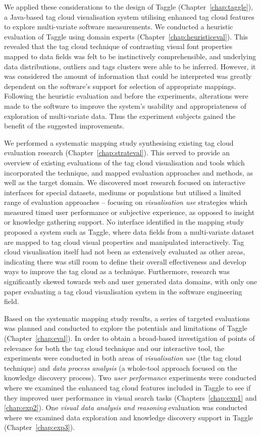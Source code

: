 We applied these considerations to the design of Taggle (Chapter~\ref{chap:taggle}), a Java-based tag cloud visualisation system utilising enhanced tag cloud features to explore multi-variate software measurements. We conducted a heuristic evaluation of Taggle using domain experts (Chapter~\ref{chap:heuristiceval}). This revealed that the tag cloud technique of contrasting visual font properties mapped to data fields was felt to be instinctively comprehensible, and underlying data distributions, outliers and tags clusters were able to be inferred. However, it was considered the amount of information that could be interpreted was greatly dependent on the software's support for selection of appropriate mappings. Following the heuristic evaluation and before the experiments, alterations were made to the software to improve the system's usability and appropriateness of exploration of multi-variate data. Thus the experiment subjects gained the benefit of the suggested improvements.

We performed a systematic mapping study synthesising existing tag cloud evaluation research (Chapter~\ref{chap:strateval}). This served to provide an overview of existing evaluations of the tag cloud visualisation and tools which incorporated the technique, and mapped evaluation approaches and methods, as well as the target domain. We discovered most research focused on interactive interfaces for special datasets, mediums or populations but utilised a limited range of evaluation approaches -- focusing on \emph{visualisation use} strategies which measured timed user performance or subjective experience, as opposed to insight or knowledge gathering support. No interface identified in the mapping study proposed a system such as Taggle, where data fields from a multi-variate dataset are mapped to tag cloud visual properties and manipulated interactively. Tag cloud visualisation itself had not been as extensively evaluated as other areas, indicating there was still room to define their overall effectiveness and develop ways to improve the tag cloud as a technique. Furthermore, research was significantly skewed towards web and user generated data domains, with only one paper evaluating a tag cloud visualisation system in the software engineering field. 

Based on the systematic mapping study results, a series of targeted evaluations was planned and conducted to explore the potentials and limitations of Taggle  (Chapter~\ref{chap:eval}). In order to obtain a broad-based investigation of points of relevance for both the tag cloud technique and our interactive tool, the experiments were conducted in both areas of \emph{visualisation use} (the tag cloud technique) and \emph{data process analysis} (a whole-tool approach focused on the knowledge discovery process). Two \emph{user performance} experiments were conducted where we examined the enhanced tag cloud features included in Taggle to see if they improved user performance in visual search tasks (Chapters~\ref{chap:exp1} and \ref{chap:exp2}). One \emph{visual data analysis and reasoning} evaluation was conducted where we examined data exploration and knowledge discovery support in Taggle (Chapter~\ref{chap:exp3}).


